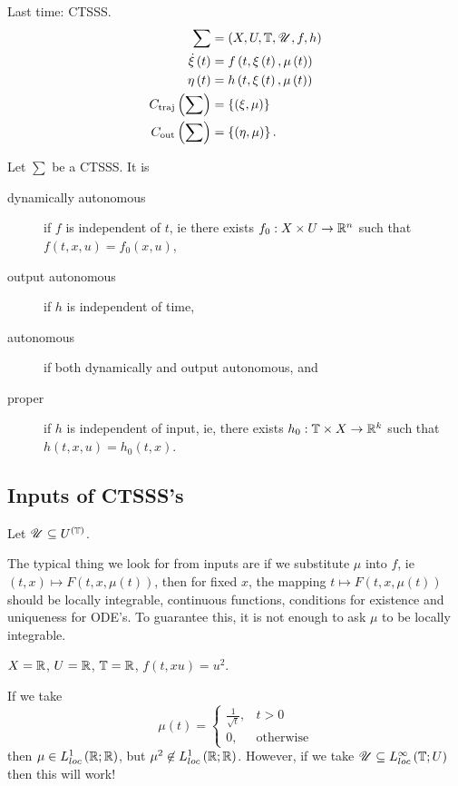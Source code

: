 
Last time: CTSSS. 
\begin{align*}
	\sum &= \left( X, U, \mathbb{T}, \mathscr{U}, f, h \right) \\
	\dot{\xi}\left( t \right) &= f\left( t, \xi\left( t \right) , \mu\left( t \right)  \right)  \\
	\eta	\left(t \right) &= h \left( t, \xi\left( t \right) , \mu\left( t \right)  \right)  \\
	C_{\text{traj}}\left( \sum \right) &= \left\{ \left( \xi, \mu \right)  \right\} \\
	C_{\text{out}}\left( \sum\right) &= \left\{ \left( \eta, \mu \right)  \right\} 
.\end{align*} 
\begin{definition}
	Let $\sum $ be a CTSSS. It is 
	\begin{description}
		\item[dynamically autonomous] if $f$ is independent of  $t$, ie there exists $f_0 : X \times U \to \mathbb{R}^{n}$ such that $f\left( t, x, u \right) = f_0 \left( x, u \right) $, 
		\item[output autonomous] if $h$ is independent of time, 
		\item[autonomous] if both dynamically and output autonomous, and 
		\item[proper] if $h$ is independent of input, ie, there exists $h_0  : \mathbb{T} \times  X  \to \mathbb{R}^{k}$ such that $h\left( t, x, u \right) = h_0 \left( t, x \right) $.
	\end{description}
\end{definition}
\subsection{Inputs of CTSSS's}
Let $\mathscr{U} \subseteq U^{\left( \mathbb{T} \right) }$. 

The typical thing we look for from inputs are if we substitute $\mu$ into $f$, ie $\left( t, x \right) \longmapsto F\left( t, x, \mu\left( t \right)  \right)$, then for fixed $x$, the mapping $t \longmapsto F\left( t, x, \mu\left( t \right)  \right) $ should be locally integrable, continuous functions, conditions for existence and uniqueness for ODE's. To guarantee this, it is not enough to ask $\mu$ to be locally integrable. 
\begin{eg}
	$X = \mathbb{R}$, $U = \mathbb{R}$, $\mathbb{T} = \mathbb{R}$, $f\left( t, x u  \right) = u^2$. 

	If we take 
	\[
		\mu\left( t \right) = \begin{cases}
			\frac{1}{\sqrt{t} }, & t > 0 \\
			0, & \text{otherwise}
		\end{cases}
	\] 
	then $\mu \in  L^{1}_{loc}\left( \mathbb{R}; \mathbb{R} \right) $, but $\mu^2 \not \in L^{1}_{loc}\left( \mathbb{R}; \mathbb{R} \right) $. However, if we take $\mathscr{U} \subseteq L^{\infty}_{loc}\left( \mathbb{T}; U \right) $ then this will work!
\end{eg}

